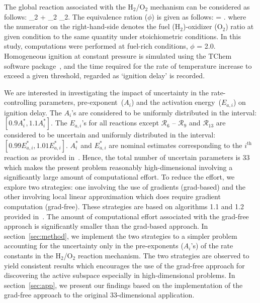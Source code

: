 The global reaction associated with the H$_2$/O$_2$ mechanism can
be considered as follows:
%
_2 + _2 _2.
\label{eq:global}
\ee 
%
The equivalence ration ($\phi$) is given as follows:
%
\be
\phi = .
\label{eq:phi}
\ee
%
where the numerator on the right-hand-side denotes the fuel (H$_2$)-oxidizer (O$_2$) ratio at given
condition to the same quantity under stoichiometric conditions. In this study, computations were performed
at fuel-rich conditions, $\phi$ = 2.0. Homogeneous ignition at constant pressure is simulated using the
TChem software package~\cite{Safta:2011}, and the time required for the rate of temperature increase
to exceed a given threshold, regarded as `ignition delay' is recorded. 

We are interested in investigating the impact of uncertainty in the rate-controlling parameters, 
pre-exponent~($A_i$) and the activation energy~($E_{a,i}$) on ignition delay. The $A_i$'s are
considered to be uniformly distributed in the interval: $[0.9A_i^\ast, 1.1A_i^\ast]$.
The $E_{a,i}$'s for all reactions except $\mathcal{R}_6$ -- $\mathcal{R}_9$ and $\mathcal{R}_{13}$
are considered to be uncertain and uniformly distributed in the interval: $[0.99E_{a,i}^\ast, 1.01E_{a,i}^\ast]$.
$A_i^\ast$ and $E_{a,i}^\ast$ are nominal estimates corresponding to the $i^\text{th}$ reaction
as provided in~\cite{Yetter:1991}. Hence, the total number of uncertain parameters is 33 which makes the
present problem reasonably high-dimensional involving a significantly large amount of computational
effort. To reduce the effort, we explore two strategies: one involving the use of gradients (grad-based)
and the other involving local linear approximation which does require gradient computation (grad-free).
These strategies are based on algorithms 1.1 and 1.2 provided  in~\cite{Constantine:2015}. The amount of 
computational effort associated with the grad-free approach is significantly smaller than the grad-based
approach. In section~\ref{sec:method}, we implement the two strategies to a simpler problem accounting for the
uncertainty only in the pre-exponents ($A_i$'s) of the rate constants in the H$_2$/O$_2$ reaction mechanism.
The two strategies are observed to yield consistent results which encourages the use of the grad-free approach
for discovering the active subspace especially in high-dimensional problems. In section~\ref{sec:app}, we present
our findings based on the implementation of the grad-free approach to the original 33-dimensional application. 

